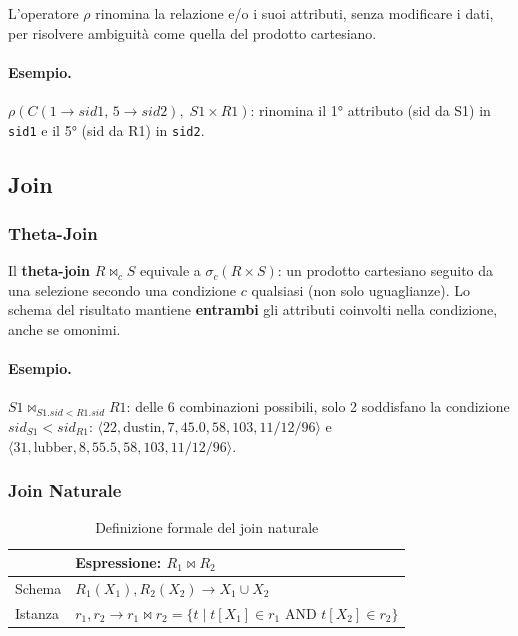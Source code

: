 \documentclass[12pt, a4paper]{article}
\begin{document}
L'operatore $\rho$ rinomina la relazione e/o i suoi attributi, senza modificare i dati, per risolvere ambiguità come quella del prodotto cartesiano.

\paragraph{Esempio.} $\rho(C(1 \rightarrow sid1,\, 5 \rightarrow sid2),\; S1 \times R1)$: rinomina il 1° attributo (sid da S1) in \texttt{sid1} e il 5° (sid da R1) in \texttt{sid2}.

\subsection{Join}

\subsubsection{Theta-Join}

Il \textbf{theta-join} $R \bowtie_c S$ equivale a $\sigma_c(R \times S)$: un prodotto cartesiano seguito da una selezione secondo una condizione $c$ qualsiasi (non solo uguaglianze). Lo schema del risultato mantiene \textbf{entrambi} gli attributi coinvolti nella condizione, anche se omonimi.

\paragraph{Esempio.} $S1 \bowtie_{S1.sid < R1.sid} R1$: delle 6 combinazioni possibili, solo 2 soddisfano la condizione $sid_{S1} < sid_{R1}$: $\langle 22,\text{dustin},7,45.0,58,103,\text{11/12/96}\rangle$ e $\langle 31,\text{lubber},8,55.5,58,103,\text{11/12/96}\rangle$.

\subsubsection{Join Naturale}

\begin{table}[H]
\centering
\begin{tabular}{@{}ll@{}}
\toprule
& \textbf{Espressione: $R_1 \bowtie R_2$} \\
\midrule
Schema & $R_1(X_1), R_2(X_2) \rightarrow X_1 \cup X_2$ \\
Istanza & $r_1, r_2 \rightarrow r_1 \bowtie r_2 = \{t \mid t[X_1] \in r_1 \text{ AND } t[X_2] \in r_2\}$ \\
\bottomrule
\end{tabular}
\caption{Definizione formale del join naturale}
\end{table}
\end{document}
